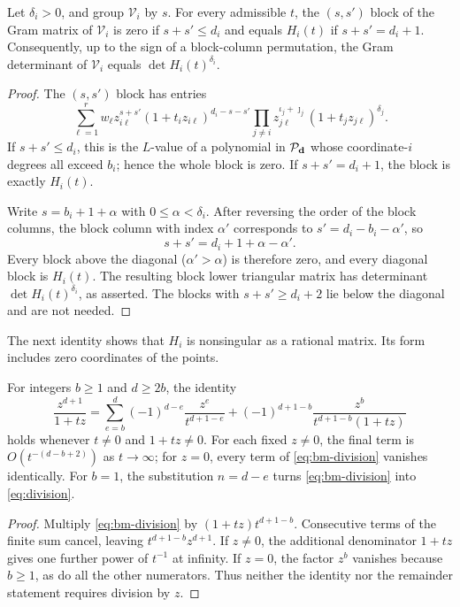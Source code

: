\begin{lemma}\label{lem:bm-anti}
Let $\delta_i>0$, and group $\mathscr V_i$ by $s$. For every admissible
$t$, the $(s,s')$ block of the Gram matrix of $\mathscr V_i$ is zero if
$s+s'\le d_i$ and equals $H_i(t)$ if $s+s'=d_i+1$. Consequently, up to
the sign of a block-column permutation, the Gram determinant of
$\mathscr V_i$ equals $\det H_i(t)^{\delta_i}$.
\end{lemma}
\begin{proof}
The $(s,s')$ block has entries
\begin{equation}\label{eq:bm-block}
\sum_{\ell=1}^r w_\ell z_{i\ell}^{s+s'}(1+t_iz_{i\ell})^{d_i-s-s'}
\prod_{j\ne i}z_{j\ell}^{\iota_j+\jmath_j}(1+t_jz_{j\ell})^{\delta_j}.
\end{equation}
If $s+s'\le d_i$, this is the $L$-value of a polynomial in $\mathcal P_{\mathbf d}$
whose coordinate-$i$ degrees all exceed $b_i$; hence the whole block
is zero. If $s+s'=d_i+1$, the block is exactly $H_i(t)$.

Write $s=b_i+1+\alpha$ with $0\le\alpha<\delta_i$. After reversing the
order of the block columns, the block column with index $\alpha'$
corresponds to $s'=d_i-b_i-\alpha'$, so
\[
s+s'=d_i+1+\alpha-\alpha'.
\]
Every block above the diagonal ($\alpha'>\alpha$) is therefore zero,
and every diagonal block is $H_i(t)$. The resulting block lower
triangular matrix has determinant $\det H_i(t)^{\delta_i}$, as
asserted. The blocks with $s+s'\ge d_i+2$ lie below the diagonal and
are not needed.
\end{proof}

The next identity shows that $H_i$ is nonsingular as a rational
matrix. Its form includes zero coordinates of the points.

\begin{lemma}\label{lem:bm-division}
For integers $b\ge1$ and $d\ge2b$, the identity
\begin{equation}\label{eq:bm-division}
\frac{z^{d+1}}{1+tz}
=\sum_{e=b}^{d}(-1)^{d-e}\frac{z^{e}}{t^{d+1-e}}
+(-1)^{d+1-b}\frac{z^{b}}{t^{d+1-b}(1+tz)}
\end{equation}
holds whenever $t\ne0$ and $1+tz\ne0$. For each fixed $z\ne0$, the
final term is $O(t^{-(d-b+2)})$ as $t\to\infty$; for $z=0$, every term
of \eqref{eq:bm-division} vanishes identically. For $b=1$, the
substitution $n=d-e$ turns \eqref{eq:bm-division} into
\eqref{eq:division}.
\end{lemma}
\begin{proof}
Multiply \eqref{eq:bm-division} by $(1+tz)t^{d+1-b}$. Consecutive terms
of the finite sum cancel, leaving $t^{d+1-b}z^{d+1}$.
If $z\ne0$, the additional denominator $1+tz$ gives one further power
of $t^{-1}$ at infinity. If $z=0$, the factor $z^b$ vanishes because
$b\ge1$, as do all the other numerators. Thus neither the identity nor
the remainder statement requires division by $z$.
\end{proof}

